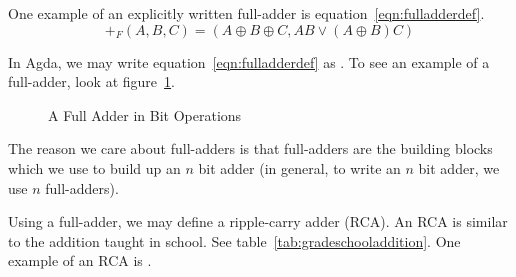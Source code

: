 \documentclass[14pt]{extarticle}  %
\begin{document}
One example of an explicitly written full-adder is equation~\ref{eqn:fulladderdef}.
\begin{equation}\label{eqn:fulladderdef}
  +_{F}(A,B,C) = (A \oplus B \oplus C , AB \lor (A \oplus B)C )
\end{equation}


In Agda, we may write equation~\ref{eqn:fulladderdef} as  .
To see an example of a full-adder, look at figure~\ref{fig:fulladder}.
 \begin{figure}[!h]
   \centering
   \caption{A Full Adder in Bit Operations}
   \label{fig:fulladder}
\end{figure}



The reason we care about full-adders is that full-adders are the building blocks which we use to build up an $n$ bit adder (in general, to write an $n$ bit adder, we use $n$ full-adders).

Using a full-adder, we may define a ripple-carry adder (RCA). An RCA is similar to the addition taught in school. See table~\ref{tab:gradeschooladdition}. One example of an RCA is .
\end{document}
